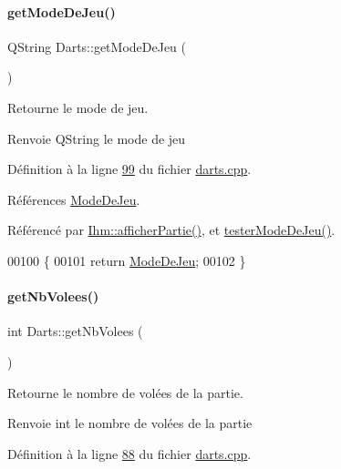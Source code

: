\paragraph{\texorpdfstring{get\+Mode\+De\+Jeu()}{getModeDeJeu()}}
{\footnotesize\ttfamily Q\+String Darts\+::get\+Mode\+De\+Jeu (\begin{DoxyParamCaption}{ }\end{DoxyParamCaption})}



Retourne le mode de jeu. 

\begin{DoxyReturn}{Renvoie}
Q\+String le mode de jeu 
\end{DoxyReturn}


Définition à la ligne \hyperlink{darts_8cpp_source_l00099}{99} du fichier \hyperlink{darts_8cpp_source}{darts.\+cpp}.



Références \hyperlink{darts_8h_source_l00081}{Mode\+De\+Jeu}.



Référencé par \hyperlink{ihm_8cpp_source_l00333}{Ihm\+::afficher\+Partie()}, et \hyperlink{darts_8cpp_source_l00506}{tester\+Mode\+De\+Jeu()}.


\begin{DoxyCode}
00100 \{
00101     \textcolor{keywordflow}{return} \hyperlink{class_darts_a281fd6201343dfb65ab81c93fd60f786}{ModeDeJeu};
00102 \}
\end{DoxyCode}
\mbox{\label{class_darts_a4b93d786fbd25b9512ad08b67bca0a69}} 
\paragraph{\texorpdfstring{get\+Nb\+Volees()}{getNbVolees()}}
{\footnotesize\ttfamily int Darts\+::get\+Nb\+Volees (\begin{DoxyParamCaption}{ }\end{DoxyParamCaption})}



Retourne le nombre de volées de la partie. 

\begin{DoxyReturn}{Renvoie}
int le nombre de volées de la partie 
\end{DoxyReturn}


Définition à la ligne \hyperlink{darts_8cpp_source_l00088}{88} du fichier \hyperlink{darts_8cpp_source}{darts.\+cpp}.



